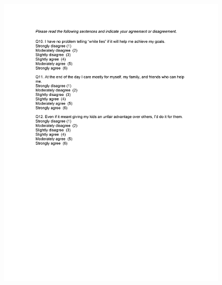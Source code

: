 \documentclass[12pt,econ]{sources/authesis}
\makeatletter
\def\maxwidth{\ifdim\Gin@nat@width>\linewidth\linewidth
\else\Gin@nat@width\fi}
\let\Oldincludegraphics\includegraphics
\renewcommand{\includegraphics}[1]{\Oldincludegraphics[width=\maxwidth]{#1}}
\makeatother
\begin{document}
\begin{figure}[hbt]
  \centering
\includegraphics{data/framing/appendix/questionnaire/questionnaire06.jpg}
\end{figure}
\end{document}
